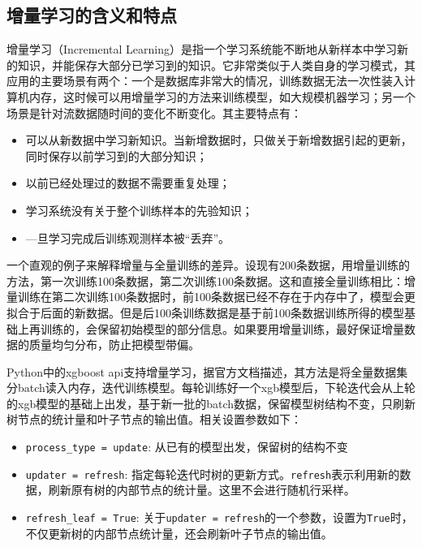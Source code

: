     \subsection{增量学习的含义和特点}
    增量学习（Incremental Learning）\cite{zhong2017survey}是指一个学习系统能不断地从新样本中学习新的知识，并能保存大部分已学习到的知识。它非常类似于人类自身的学习模式，其应用的主要场景有两个：一个是数据库非常大的情况，训练数据无法一次性装入计算机内存，这时候可以用增量学习的方法来训练模型，如大规模机器学习；另一个场景是针对流数据随时间的变化不断变化。其主要特点有：
    \begin{itemize}
      \item 可以从新数据中学习新知识。当新增数据时，只做关于新增数据引起的更新，同时保存以前学习到的大部分知识；
      \item 以前已经处理过的数据不需要重复处理；
      \item 学习系统没有关于整个训练样本的先验知识；
      \item —旦学习完成后训练观测样本被“丢弃”。
    \end{itemize}

    一个直观的例子来解释增量与全量训练的差异。设现有200条数据，用增量训练的方法，第一次训练100条数据，第二次训练100条数据。这和直接全量训练相比：增量训练在第二次训练100条数据时，前100条数据已经不存在于内存中了，模型会更拟合于后面的新数据。但是后100条训练数据是基于前100条数据训练所得的模型基础上再训练的，会保留初始模型的部分信息。如果要用增量训练，最好保证增量数据的质量均匀分布，防止把模型带偏。

    Python中的xgboost api支持增量学习，据官方文档描述，其方法是将全量数据集分batch读入内存，迭代训练模型。每轮训练好一个xgb模型后，下轮迭代会从上轮的xgb模型的基础上出发，基于新一批的batch数据，保留模型树结构不变，只刷新树节点的统计量和叶子节点的输出值。相关设置参数如下：
    \begin{itemize}
      \item \texttt{process_type = update}: 从已有的模型出发，保留树的结构不变
      \item \texttt{updater = refresh}: 指定每轮迭代时树的更新方式。\texttt{refresh}表示利用新的数据，刷新原有树的内部节点的统计量。这里不会进行随机行采样。
      \item \texttt{refresh_leaf = True}: 关于\texttt{updater = refresh}的一个参数，设置为\texttt{True}时，不仅更新树的内部节点统计量，还会刷新叶子节点的输出值。
    \end{itemize}


